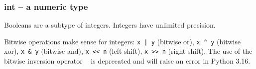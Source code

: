 \subsubsection{int -- a numeric type}
Booleans are a subtype of integers.
Integers have unlimited precision.

Bitwise operations make sense for integers: \texttt{x | y} (bitwise or), \texttt{x ^ y} (bitwise xor), \texttt{x & y} (bitwise and), \texttt{x << n} (left shift), \texttt{x >> n} (right shift).
The use of the bitwise inversion operator \texttt{~} is deprecated and will raise an error in Python 3.16.
